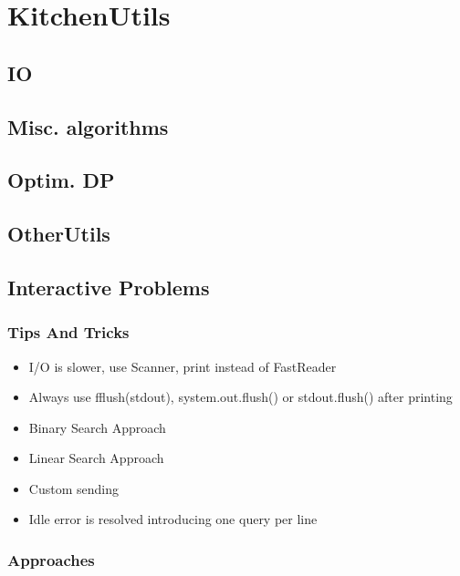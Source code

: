 \chapter{KitchenUtils}

\section{IO}

\section{Misc. algorithms}

 \section{Optim. DP}

  \section{OtherUtils}

  \section{Interactive Problems}
  	\subsection{Tips And Tricks}
		\begin{itemize}
			\item I/O is slower, use Scanner, print instead of FastReader
			\item Always use fflush(stdout), system.out.flush() or stdout.flush() after printing
			\item Binary Search Approach
			\item Linear Search Approach
			\item Custom sending
			\item Idle error is resolved introducing one query per line
		\end{itemize}
  	\subsection{Approaches}
